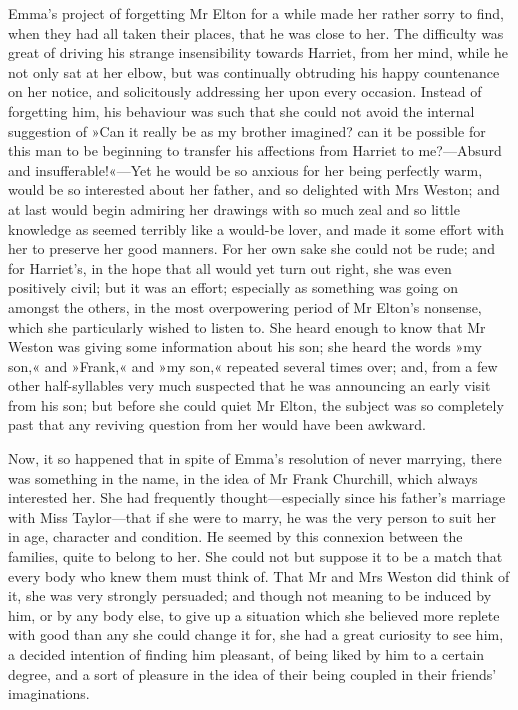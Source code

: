 Emma's project of forgetting Mr Elton for a while made her rather sorry to find, when they had all taken their places, that he was close to her. The difficulty was great of driving his strange insensibility towards Harriet, from her mind, while he not only sat at her elbow, but was continually obtruding his happy countenance on her notice, and solicitously addressing her upon every occasion. Instead of forgetting him, his behaviour was such that she could not avoid the internal suggestion of »Can it really be as my brother imagined? can it be possible for this man to be beginning to transfer his affections from Harriet to me?—Absurd and insufferable!«—Yet he would be so anxious for her being perfectly warm, would be so interested about her father, and so delighted with Mrs Weston; and at last would begin admiring her drawings with so much zeal and so little knowledge as seemed terribly like a would-be lover, and made it some effort with her to preserve her good manners. For her own sake she could not be rude; and for Harriet's, in the hope that all would yet turn out right, she was even positively civil; but it was an effort; especially as something was going on amongst the others, in the most overpowering period of Mr Elton's nonsense, which she particularly wished to listen to. She heard enough to know that Mr Weston was giving some information about his son; she heard the words »my son,« and »Frank,« and »my son,« repeated several times over; and, from a few other half-syllables very much suspected that he was announcing an early visit from his son; but before she could quiet Mr Elton, the subject was so completely past that any reviving question from her would have been awkward.

Now, it so happened that in spite of Emma's resolution of never marrying, there was something in the name, in the idea of Mr Frank Churchill, which always interested her. She had frequently thought—especially since his father's marriage with Miss Taylor—that if she were to marry, he was the very person to suit her in age, character and condition. He seemed by this connexion between the families, quite to belong to her. She could not but suppose it to be a match that every body who knew them must think of. That Mr and Mrs Weston did think of it, she was very strongly persuaded; and though not meaning to be induced by him, or by any body else, to give up a situation which she believed more replete with good than any she could change it for, she had a great curiosity to see him, a decided intention of finding him pleasant, of being liked by him to a certain degree, and a sort of pleasure in the idea of their being coupled in their friends' imaginations.

